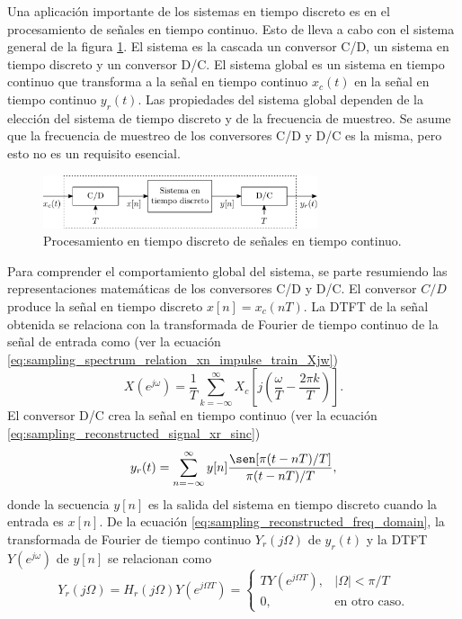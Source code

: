 \documentclass[a4paper]{report}
\begin{document}
Una aplicación importante de los sistemas en tiempo discreto es en el procesamiento de señales en tiempo continuo. Esto de lleva a cabo con el sistema general de la figura \ref{fig:sampling_discrete_processing_continuous_signal_block_diagram}. El sistema es la cascada un conversor C/D, un sistema en tiempo discreto y un conversor D/C. El sistema global es un sistema en tiempo continuo que transforma a la señal en tiempo continuo \(x_c(t)\) en la señal en tiempo continuo \(y_r(t)\). Las propiedades del sistema global dependen de la elección del sistema de tiempo discreto y de la frecuencia de muestreo. Se asume que la frecuencia de muestreo de los conversores C/D y D/C es la misma, pero esto no es un requisito esencial.
\begin{figure}[!htb]
 \begin{center}
 \includegraphics[width=0.72\textwidth]{figuras/sampling_discrete_processing_continous_signal_block_diagram.pdf}
 \caption{\label{fig:sampling_discrete_processing_continuous_signal_block_diagram} Procesamiento en tiempo discreto de señales en tiempo continuo.}
 \end{center}
\end{figure} 

Para comprender el comportamiento global del sistema, se parte resumiendo las representaciones matemáticas de los conversores C/D y D/C. El conversor \(C/D\) produce la señal en tiempo discreto \(x[n]=x_c(nT)\). La DTFT de la señal obtenida se relaciona con la transformada de Fourier de tiempo continuo de la señal de entrada como (ver la ecuación \ref{eq:sampling_spectrum_relation_xn_impulse_train_Xjw})
\begin{equation}\label{eq:sampling_cd_conversion_freq_relation}
 X(e^{j\omega})=\frac{1}{T}\sum_{k=-\infty}^{\infty}X_c\left[j\left(\frac{\omega}{T}-\frac{2\pi k}{T}\right)\right]. 
\end{equation}
El conversor D/C crea la señal en tiempo continuo (ver la ecuación \ref{eq:sampling_reconstructed_signal_xr_sinc})
\[
 y_r(t)=\sum_{n=-\infty}^\infty y[n]\frac{\sen[\pi(t-nT)/T]}{\pi(t-nT)/T},
\]
donde la secuencia \(y[n]\) es la salida del sistema en tiempo discreto cuando la entrada es \(x[n]\). De la ecuación \ref{eq:sampling_reconstructed_freq_domain}, la transformada de Fourier de tiempo continuo \(Y_r(j\Omega)\) de \(y_r(t)\) y la DTFT \(Y(e^{j\omega})\) de \(y[n]\) se relacionan como
\begin{equation}\label{eq:sampling_dc_conversion_freq_relation}
 Y_r(j\Omega)=H_r(j\Omega)Y(e^{j\Omega T})
 =\left\{
  \begin{array}{ll}
   TY(e^{j\Omega T}), & |\Omega|<\pi/T\\
   0, & \textrm{en otro caso}.
  \end{array}
  \right.
\end{equation}
\end{document}
